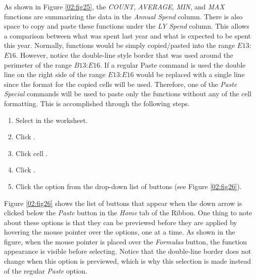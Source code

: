 As shown in Figure \ref{02:fig25}, the \textit{COUNT}, \textit{AVERAGE}, \textit{MIN}, and \textit{MAX} functions are summarizing the data in the \textit{Annual Spend} column. There is also space to copy and paste these functions under the \textit{LY Spend} column. This allows a comparison between what was spent last year and what is expected to be spent this year. Normally, functions would be simply copied/pasted into the range $ E13 $:$ E16 $. However, notice the double-line style border that was used around the perimeter of the range $ B13 $:$ E16 $. If a regular Paste command is used the double line on the right side of the range $ E13 $:$ E16 $ would be replaced with a single line since the format for the copied cells will be used. Therefore, one of the \textit{Paste Special} commands will be used to paste only the functions without any of the cell formatting. This is accomplished through the following steps.

\begin{enumerate}
	\item Select  in the  worksheet.
	\item Click .
	\item Click cell .
	\item Click .
	\item Click the  option from the drop-down list of buttons (see Figure \ref{02:fig26}).
\end{enumerate}

Figure \ref{02:fig26} shows the list of buttons that appear when the down arrow is clicked below the \textit{Paste} button in the \textit{Home} tab of the Ribbon. One thing to note about these options is that they can be previewed before they are applied by hovering the mouse pointer over the options, one at a time. As shown in the figure, when the mouse pointer is placed over the \textit{Formulas} button, the function appearance is visible before selecting. Notice that the double-line border does not change when this option is previewed, which is why this selection is made instead of the regular \textit{Paste} option.

